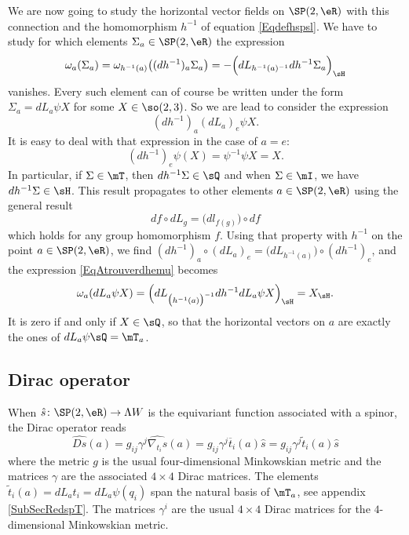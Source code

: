 We are now going to study the horizontal vector fields on $\SP(2,\eR)$ with this connection and the homomorphism $h^{-1}$ of equation \eqref{Eqdefhspsl}. We have to study for which elements $\Sigma_a\in \SP(2,\eR)$ the expression
\begin{equation}		\label{EqAtrouverdhemu}
  \omega_a(\Sigma_a)=\omega_{h^{-1}(a)}\big( (dh^{-1})_a\Sigma_a \big)=-\Big( dL_{h^{-1}(a)^{-1}}dh^{-1}\Sigma_a \Big)_{\sH}
\end{equation}
vanishes. Every such element can of course be written under the form $\Sigma_a=dL_a\psi X$ for some $X\in \so(2,3)$. So we are lead to consider the expression
\begin{equation} 		\label{Eqdhemuconide}
  (dh^{-1})_a(dL_a)_e\psi X.
\end{equation}
It is easy to deal with that expression in the case of $a=e$:
\[ 
  (dh^{-1})_e\psi(X)=\psi^{-1}\psi X=X.
\]
In particular, if $\Sigma\in\mT$, then $dh^{-1}\Sigma\in\sQ$ and when $\Sigma\in\mI$, we have $dh^{-1}\Sigma\in\sH$. This result propagates to other elements $a\in \SP(2,\eR)$ using the general result
\[ 
  df\circ dL_g=\big( dl_{f(g)} \big)\circ df
\]
which holds for any group homomorphism $f$. Using that property with $h^{-1}$ on the point $a\in \SP(2,\eR)$, we find $(dh^{-1})_a\circ(dL_a)_e=\big( dL_{h^{-1}(a)} \big)\circ (dh^{-1})_e$, and the expression \eqref{EqAtrouverdhemu} becomes
\[ 
  \omega_a(dL_a\psi X)=\Big( dL_{\big(h^{-1}(a)\big)^{-1}}dh^{-1} dL_a\psi X \Big)_{\sH}=X_{\sH}.
\]
It is zero if and only if $X\in\sQ$, so that the horizontal vectors on $a$ are exactly the ones of $dL_a\psi\sQ=\mT_a$.

\subsection{Dirac operator}

When $\hat{s}\colon \SP(2,\eR) \to \Lambda W$ is the equivariant function associated with a spinor, the Dirac operator reads
\begin{equation}		\label{EqDiracAdsquatre}
\widehat{Ds}(a)=g_{ij}\gamma^j\widehat{\nabla_{t_i}s}(a)
		=g_{ij}\gamma^j\overline{ t }_i(a)\hat{s}
		=g_{ij}\gamma^j\tilde t_i(a)\hat{s}
\end{equation}
where the metric $g$ is the usual four-dimensional Minkowskian metric and the matrices $\gamma$ are the associated $4\times 4$ Dirac matrices. The elements $\tilde t_i(a)=dL_at_i=dL_a\psi(q_i)$ span the natural basis of $\mT_a$, see appendix \ref{SubSecRedspT}. The matrices $\gamma^i$ are the usual $4\times 4$ Dirac matrices for the $4$-dimensional Minkowskian metric.

